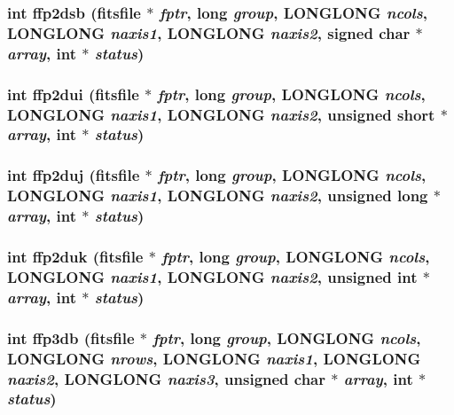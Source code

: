 \subsubsection{\setlength{\rightskip}{0pt plus 5cm}int ffp2dsb (\bf{fitsfile} $\ast$ {\em fptr}, long {\em group}, \bf{LONGLONG} {\em ncols}, \bf{LONGLONG} {\em naxis1}, \bf{LONGLONG} {\em naxis2}, signed char $\ast$ {\em array}, int $\ast$ {\em status})}\label{fitsio_8h_e6a70017924d08f130af5f122d7b610e}


\subsubsection{\setlength{\rightskip}{0pt plus 5cm}int ffp2dui (\bf{fitsfile} $\ast$ {\em fptr}, long {\em group}, \bf{LONGLONG} {\em ncols}, \bf{LONGLONG} {\em naxis1}, \bf{LONGLONG} {\em naxis2}, unsigned short $\ast$ {\em array}, int $\ast$ {\em status})}\label{fitsio_8h_35a8533785911cfd707b4ec578f431b0}


\subsubsection{\setlength{\rightskip}{0pt plus 5cm}int ffp2duj (\bf{fitsfile} $\ast$ {\em fptr}, long {\em group}, \bf{LONGLONG} {\em ncols}, \bf{LONGLONG} {\em naxis1}, \bf{LONGLONG} {\em naxis2}, unsigned long $\ast$ {\em array}, int $\ast$ {\em status})}\label{fitsio_8h_894a5478ff80f7822a394abc4cac5db3}


\subsubsection{\setlength{\rightskip}{0pt plus 5cm}int ffp2duk (\bf{fitsfile} $\ast$ {\em fptr}, long {\em group}, \bf{LONGLONG} {\em ncols}, \bf{LONGLONG} {\em naxis1}, \bf{LONGLONG} {\em naxis2}, unsigned int $\ast$ {\em array}, int $\ast$ {\em status})}\label{fitsio_8h_7daa3c68214e4bf5e9510489d23c8344}


\subsubsection{\setlength{\rightskip}{0pt plus 5cm}int ffp3db (\bf{fitsfile} $\ast$ {\em fptr}, long {\em group}, \bf{LONGLONG} {\em ncols}, \bf{LONGLONG} {\em nrows}, \bf{LONGLONG} {\em naxis1}, \bf{LONGLONG} {\em naxis2}, \bf{LONGLONG} {\em naxis3}, unsigned char $\ast$ {\em array}, int $\ast$ {\em status})}\label{fitsio_8h_509db23e215c4ac2df334edd78851e1e}



